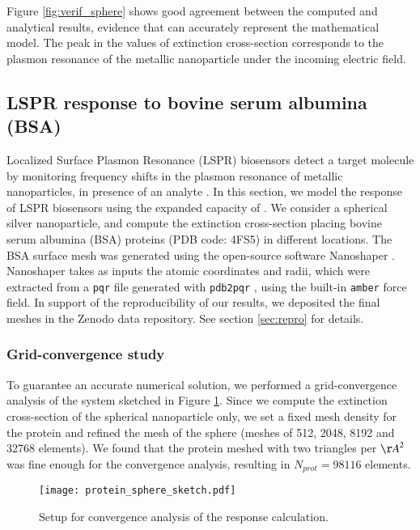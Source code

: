 Figure \ref{fig:verif_sphere} shows good agreement between the computed and analytical results, 
evidence that \pygbe can accurately represent the mathematical model. The 
peak in the values of extinction cross-section corresponds to the plasmon resonance of the metallic
nanoparticle under the incoming electric field.


\subsection{LSPR response to bovine serum albumina (BSA)} \label{sec:lspr_response}

Localized Surface Plasmon Resonance (LSPR) biosensors detect a target molecule by monitoring
frequency shifts in the plasmon resonance of metallic nanoparticles, in presence of an analyte \cite{WilletsVandyune2007}.
In this section, we model the response of LSPR biosensors using the expanded capacity of \pygbe.
We consider a spherical silver nanoparticle, and compute the extinction cross-section placing 
bovine serum albumina (BSA) proteins (PDB code: 4FS5) in different locations.
The BSA surface mesh was generated using the open-source software Nanoshaper \cite{Nanoshaper}. 
Nanoshaper takes as inputs the atomic coordinates and radii, which were 
extracted from a \texttt{pqr} file generated with \texttt{pdb2pqr} \cite{Dolinsky04},
 using the built-in \texttt{amber} force field.
 In support of the reproducibility of our results, we deposited the final meshes in the Zenodo data repository.
See section \ref{sec:repro} for details.

\subsubsection{Grid-convergence study} \label{sec:bsa_convergence}
To guarantee an accurate numerical solution, we performed a grid-convergence 
analysis of the system sketched in Figure \ref{fig:setup_conv}. 
Since we compute the extinction cross-section of the spherical nanoparticle only, we 
set a fixed mesh density for the protein and refined the mesh of the
sphere (meshes of 512, 2048, 8192 and 32768 elements). We found that the protein meshed with two
triangles per ${\AA}^2$ was fine enough for the convergence analysis, resulting in $N_{prot} = 98116$ elements. 


\begin{figure}[h] %
   \centering
   \texttt{[image: protein\_sphere\_sketch.pdf]} 
   \caption{Setup for convergence analysis of the response calculation.}
   \label{fig:setup_conv}
\end{figure}

